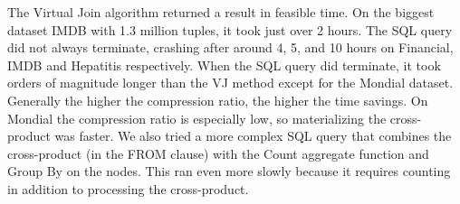 \documentclass{vldb}
\newcommand{\ct}{\mathit{ct}}
\begin{document}

The Virtual Join algorithm returned a result in feasible time. On the biggest dataset IMDB with 1.3 million tuples, it took just over 2 hours. The SQL query did not always terminate, crashing after around 4, 5, and 10 hours on Financial, IMDB and Hepatitis respectively. When the SQL query did terminate, it took orders of magnitude longer than the VJ method except for the Mondial dataset. Generally the higher the compression ratio, the higher the time savings. On Mondial the compression ratio is especially low, so materializing the cross-product was faster. We also tried a more complex SQL query that combines the cross-product (in the FROM clause) with the Count aggregate function and Group By on the nodes. This ran even more slowly because it requires counting in addition to processing the cross-product.

 
%
%
%


\end{document}
